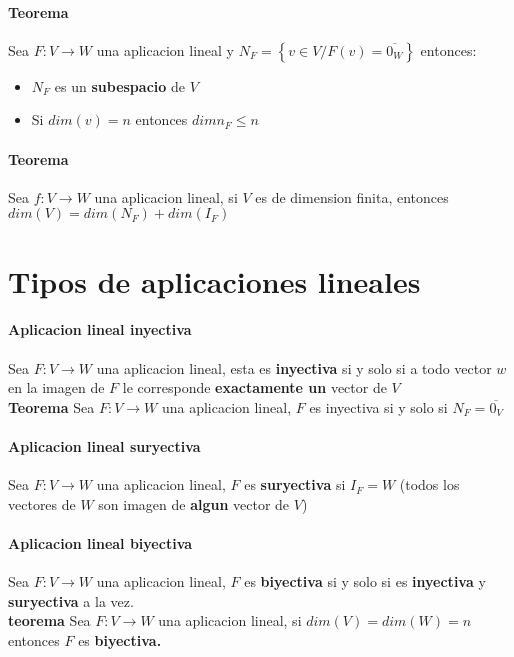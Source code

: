 \documentclass[10pt]{article}
\begin{document}
\paragraph{Teorema} Sea $F:V\rightarrow W$ una aplicacion lineal y $N_F = \left\lbrace v \in V / F(v) = \overline{0_W} \right\rbrace $ entonces:
\begin{itemize}
	\item $N_F$ es un \textbf{subespacio} de $V$
	\item Si $dim(v) = n$ entonces $dim n_F \leq n$
\end{itemize}

\paragraph{Teorema} Sea $f:V \rightarrow W$ una aplicacion lineal, si $V$ es de dimension finita, entonces $dim(V) = dim(N_F) + dim(I_F)$

\section{Tipos de aplicaciones lineales}

\paragraph{Aplicacion lineal inyectiva}

Sea $F:V\rightarrow W$ una aplicacion lineal, esta es \textbf{inyectiva} si y solo si a todo vector $w$ en la imagen de $F$ le corresponde \textbf{exactamente un} vector de $V$\\
\linebreak
\textbf{Teorema} Sea $F:V\rightarrow W$ una aplicacion lineal, $F$ es inyectiva si y solo si $N_F = {\overline{0_V}}$

\paragraph{Aplicacion lineal suryectiva}

Sea $F:V\rightarrow W$ una aplicacion lineal, $F$ es \textbf{suryectiva} si $I_F = W$ (todos los vectores de $W$ son imagen de \textbf{algun} vector de $V$) 

\paragraph{Aplicacion lineal biyectiva}

Sea $F:V\rightarrow W$ una aplicacion lineal, $F$ es \textbf{biyectiva} si y solo si es \textbf{inyectiva} y \textbf{suryectiva} a  la vez.\\
\linebreak
\textbf{teorema} Sea $F:V\rightarrow W$ una aplicacion lineal, si $dim(V) = dim(W) = n$ entonces $F$ es \textbf{biyectiva.} 
\end{document}

